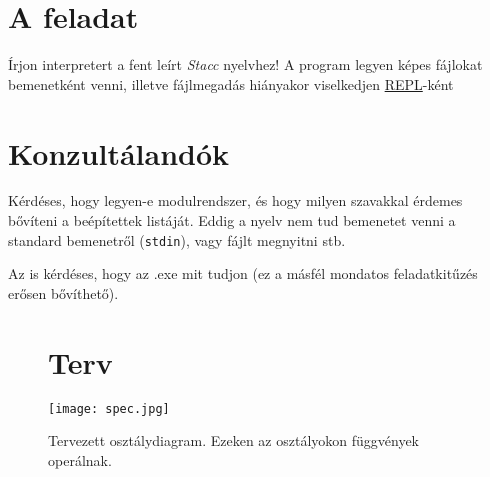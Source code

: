 \documentclass[a4paper]{article}
\newcommand{\stacc}{{\it Stacc }}
\begin{document}
\section*{A feladat}
Írjon interpretert a fent leírt \stacc nyelvhez! A program legyen képes fájlokat bemenetként venni, illetve fájlmegadás hiányakor viselkedjen \href{https://en.wikipedia.org/wiki/Read-eval-print_loop}{REPL}-ként

\section*{Konzultálandók}

Kérdéses, hogy legyen-e modulrendszer, és hogy milyen szavakkal érdemes bővíteni a beépítettek listáját. Eddig a nyelv nem tud bemenetet venni a standard bemenetről (\verb|stdin|), vagy fájlt megnyitni stb.

Az is kérdéses, hogy az .exe mit tudjon (ez a másfél mondatos feladatkitűzés erősen bővíthető).

\pagebreak

\begin{figure}[h]
\section*{Terv}
\centering
\texttt{[image: spec.jpg]}
\caption{Tervezett osztálydiagram. Ezeken az osztályokon függvények operálnak.}
\end{figure}
\end{document}
